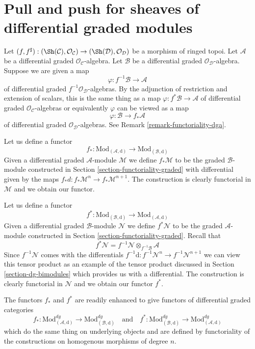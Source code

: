 \section{Pull and push for sheaves of differential graded modules}
\label{section-functoriality-dg}

\noindent
Let $(f, f^\sharp) : (\Sh(\mathcal{C}), \mathcal{O}_\mathcal{C})
\to (\Sh(\mathcal{D}), \mathcal{O}_\mathcal{D})$
be a morphism of ringed topoi. Let $\mathcal{A}$ be a differential
graded $\mathcal{O}_\mathcal{C}$-algebra. Let $\mathcal{B}$ be a
differential graded $\mathcal{O}_\mathcal{D}$-algebra.
Suppose we are given a map
$$
\varphi : f^{-1}\mathcal{B} \to \mathcal{A}
$$
of differential graded $f^{-1}\mathcal{O}_\mathcal{D}$-algebras.
By the adjunction of restriction and extension of scalars, this
is the same thing as a map $\varphi : f^*\mathcal{B} \to \mathcal{A}$
of differential graded $\mathcal{O}_\mathcal{C}$-algebras or equivalently
$\varphi$ can be viewed as a map
$$
\varphi : \mathcal{B} \to f_*\mathcal{A}
$$
of differential graded $\mathcal{O}_\mathcal{D}$-algebras.
See Remark \ref{remark-functoriality-dga}.

\medskip\noindent
Let us define a functor
$$
f_* :
\text{Mod}_{(\mathcal{A}, \text{d})}
\longrightarrow
\text{Mod}_{(\mathcal{B}, \text{d})}
$$
Given a differential graded $\mathcal{A}$-module $\mathcal{M}$ we define
$f_*\mathcal{M}$ to be the graded $\mathcal{B}$-module constructed
in Section \ref{section-functoriality-graded} with differential
given by the maps $f_*d : f_*\mathcal{M}^n \to f_*\mathcal{M}^{n + 1}$.
The construction is clearly functorial in
$\mathcal{M}$ and we obtain our functor.

\medskip\noindent
Let us define a functor
$$
f^* :
\text{Mod}_{(\mathcal{B}, \text{d})}
\longrightarrow
\text{Mod}_{(\mathcal{A}, \text{d})}
$$
Given a differential graded $\mathcal{B}$-module $\mathcal{N}$
we define $f^*\mathcal{N}$ to be the graded $\mathcal{A}$-module
constructed in Section \ref{section-functoriality-graded}. Recall
that
$$
f^*\mathcal{N} = f^{-1}\mathcal{N} \otimes_{f^{-1}\mathcal{B}} \mathcal{A}
$$
Since $f^{-1}\mathcal{N}$ comes with the differentials
$f^{-1}\text{d} : f^{-1}\mathcal{N}^n \to f^{-1}\mathcal{N}^{n + 1}$
we can view this tensor product as an example of the
tensor product discussed in Section \ref{section-dg-bimodules}
which provides us with a differential.
The construction is clearly functorial in
$\mathcal{N}$ and we obtain our functor $f^*$.

\medskip\noindent
The functors $f_*$ and $f^*$ are readily enhanced to give
functors of differential graded categories
$$
f_* :
\text{Mod}^{dg}_{(\mathcal{A}, \text{d})}
\longrightarrow
\text{Mod}^{dg}_{(\mathcal{B}, \text{d})}
\quad\text{and}\quad
f^* :
\text{Mod}^{dg}_{(\mathcal{B}, \text{d})}
\longrightarrow
\text{Mod}^{dg}_{(\mathcal{A}, \text{d})}
$$
which do the same thing on underlying objects and are defined
by functoriality of the constructions on homogenous morphisms
of degree $n$.


